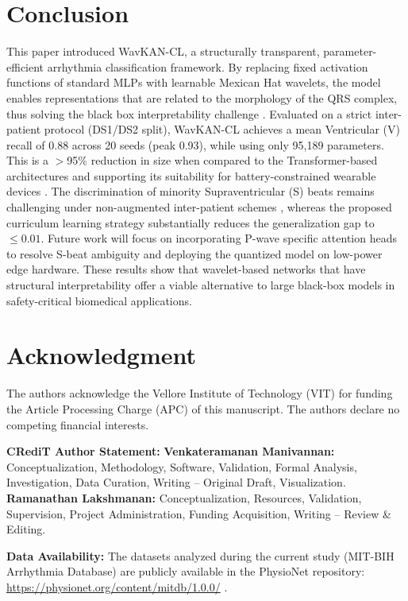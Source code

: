 \documentclass[journal,twoside,web]{ieeecolor}
\begin{document}
\section{Conclusion}
\label{sec:conclusion}
This paper introduced WavKAN-CL, a structurally transparent, parameter-efficient arrhythmia classification framework. By replacing fixed activation functions of standard MLPs with learnable Mexican Hat wavelets, the model enables representations that are related to the morphology of the QRS complex, thus solving the black box interpretability challenge \cite{taleban_explainable_2026}. Evaluated on a strict inter-patient protocol (DS1/DS2 split), WavKAN-CL achieves a mean Ventricular (V) recall of 0.88 across 20 seeds (peak 0.93), while using only 95,189 parameters. This is a $>$95\% reduction in size when compared to the Transformer-based architectures and supporting its suitability for battery-constrained wearable devices \cite{farag_tiny_2023}. The discrimination of minority Supraventricular (S) beats remains challenging under non-augmented inter-patient schemes \cite{bahrami_investigation_2025}, whereas the proposed curriculum learning strategy substantially reduces the generalization gap to $\le 0.01$. Future work will focus on incorporating P-wave specific attention heads to resolve S-beat ambiguity and deploying the quantized model on low-power edge hardware. These results show that wavelet-based networks that have structural interpretability offer a viable alternative to large black-box models in safety-critical biomedical applications.


\section*{Acknowledgment}
The authors acknowledge the Vellore Institute of Technology (VIT) for funding the Article Processing Charge (APC) of this manuscript. The authors declare no competing financial interests.

\textbf{CRediT Author Statement:}
\textbf{Venkateramanan Manivannan:} Conceptualization, Methodology, Software, Validation, Formal Analysis, Investigation, Data Curation, Writing -- Original Draft, Visualization.
\textbf{Ramanathan Lakshmanan:} Conceptualization, Resources, Validation, Supervision, Project Administration, Funding Acquisition, Writing -- Review \& Editing.

\textbf{Data Availability:} The datasets analyzed during the current study (MIT-BIH Arrhythmia Database) are publicly available in the PhysioNet repository: \url{https://physionet.org/content/mitdb/1.0.0/} \cite{moody_mit-bih_1992}.
\end{document}
